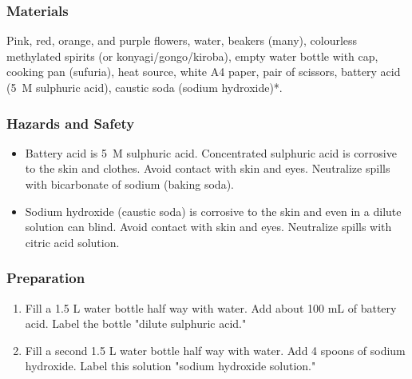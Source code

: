\subsubsection*{Materials}
Pink, red, orange, and purple flowers, water, beakers (many), colourless methylated spirits (or konyagi/gongo/kiroba), empty water bottle with cap, cooking pan (sufuria), heat source, white A4 paper, pair of scissors, battery acid (5~M sulphuric acid), caustic soda (sodium hydroxide)*.

\subsubsection*{Hazards and Safety}
\begin{itemize}
\item{Battery acid is 5~M sulphuric acid. Concentrated sulphuric acid is corrosive to the skin and clothes. Avoid contact with skin and eyes. Neutralize spills with bicarbonate of sodium (baking soda).}
\item{Sodium hydroxide (caustic soda) is corrosive to the skin and even in a dilute solution can blind. Avoid contact with skin and eyes. Neutralize spills with citric acid solution.}
\end{itemize}

\subsubsection*{Preparation}
\begin{enumerate}
\item{Fill a 1.5 L water bottle half way with water. Add about 100 mL of battery acid. Label the bottle "dilute sulphuric acid."}
\item{Fill a second 1.5 L water bottle half way with water. Add 4 spoons of sodium hydroxide. Label this solution "sodium hydroxide solution."}
\end{enumerate}

